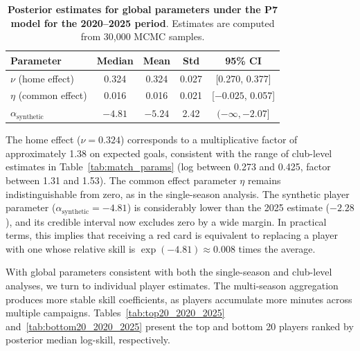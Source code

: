 \begin{table}[htbp]
    \centering
    \begin{tabular}{lcccc}
        \toprule
        Parameter & Median & Mean & Std & 95\% CI \\
        \midrule
        $\nu$ (home effect) & 0.324 & 0.324 & 0.027 & [0.270, 0.377] \\
        $\eta$ (common effect) & 0.016 & 0.016 & 0.021 & [$-0.025$, 0.057] \\
        $\alpha_{\text{synthetic}}$ & $-4.81$ & $-5.24$ & 2.42 & $(-\infty, -2.07]$ \\
        \bottomrule
    \end{tabular}
    \caption{
        \textbf{Posterior estimates for global parameters under the P7 model for the 2020--2025 period}.
        Estimates are computed from 30,000 MCMC samples.
    }
    \label{tab:player_global_2020_2025}
\end{table}

The home effect ($\nu = 0.324$) corresponds to a multiplicative factor of approximately 1.38 on expected goals, consistent with the range of club-level estimates in Table~\ref{tab:match_params} (log between 0.273 and 0.425, factor between 1.31 and 1.53).
The common effect parameter $\eta$ remains indistinguishable from zero, as in the single-season analysis.
The synthetic player parameter ($\alpha_{\text{synthetic}} = -4.81$) is considerably lower than the 2025 estimate ($-2.28$), and its credible interval now excludes zero by a wide margin.
In practical terms, this implies that receiving a red card is equivalent to replacing a player with one whose relative skill is $\exp(-4.81) \approx 0.008$ times the average.

With global parameters consistent with both the single-season and club-level analyses, we turn to individual player estimates.
The multi-season aggregation produces more stable skill coefficients, as players accumulate more minutes across multiple campaigns.
Tables~\ref{tab:top20_2020_2025} and~\ref{tab:bottom20_2020_2025} present the top and bottom 20 players ranked by posterior median log-skill, respectively.

